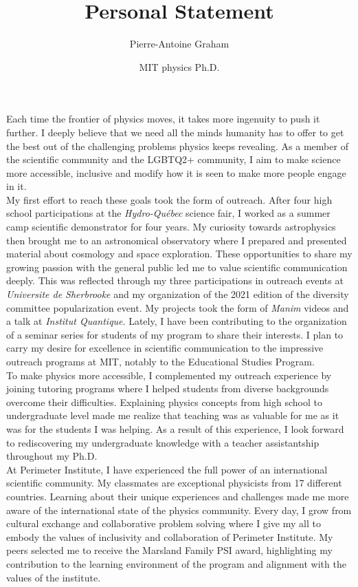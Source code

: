 \documentclass[12pt]{article}
\title{Personal Statement}
\author{Pierre-Antoine Graham}
\date{MIT physics Ph.D.}
\begin{document}
\maketitle
\vspace{0.5cm}

Each time the frontier of physics moves, it takes more ingenuity to push it further. I deeply believe that we need all the minds humanity has to offer to get the best out of the challenging problems physics keeps revealing. As a member of the scientific community and the LGBTQ2+ community, I aim to make science more accessible, inclusive and modify how it is seen to make more people engage in it.\\[0.3cm]

My first effort to reach these goals took the form of outreach. After four high school participations at the \textit{Hydro-Québec} science fair, I worked as a summer camp scientific demonstrator for four years. My curiosity towards astrophysics then brought me to an astronomical observatory where I prepared and presented material about cosmology and space exploration. These opportunities to share my growing passion with the general public led me to value scientific communication deeply. This was reflected through my three participations in outreach events at \textit{Universite de Sherbrooke} and my organization of the 2021 edition of the diversity committee popularization event. My projects took the form of \textit{Manim} videos and a talk at \textit{Institut Quantique}. Lately, I have been contributing to the organization of a seminar series for students of my program to share their interests. I plan to carry my desire for excellence in scientific communication to the impressive outreach programs at MIT, notably to the Educational Studies Program.\\[0.3cm]

To make physics more accessible, I complemented my outreach experience by joining tutoring programs where I helped students from diverse backgrounds overcome their difficulties. Explaining physics concepts from high school to undergraduate level made me realize that teaching was as valuable for me as it was for the students I was helping. As a result of this experience, I look forward to rediscovering my undergraduate knowledge with a teacher assistantship throughout my Ph.D.\\[0.3cm]

At Perimeter Institute, I have experienced the full power of an international scientific community. My classmates are exceptional physicists from 17 different countries. Learning about their unique experiences and challenges made me more aware of the international state of the physics community. Every day, I grow from cultural exchange and collaborative problem solving where I give my all to embody the values of inclusivity and collaboration of Perimeter Institute. My peers selected me to receive the Marsland Family PSI award, highlighting my contribution to the learning environment of the program and alignment with the values of the institute.\\[0.3cm]
\end{document}

